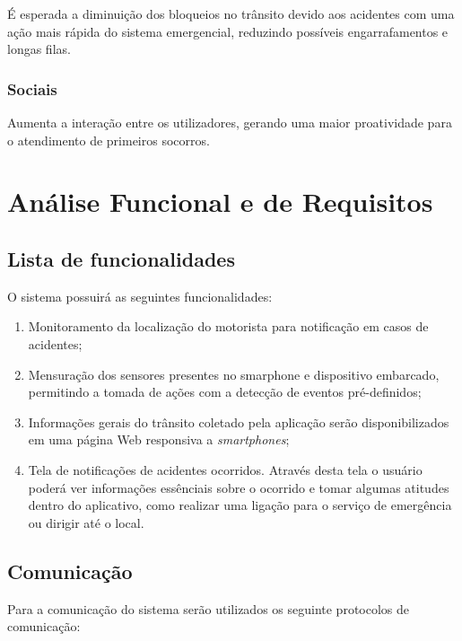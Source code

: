 É esperada a diminuição dos bloqueios no trânsito devido aos acidentes com uma ação mais rápida do sistema emergencial, reduzindo possíveis engarrafamentos e longas filas.





\subsubsection{Sociais}
Aumenta a interação entre os utilizadores, gerando uma maior proatividade para o atendimento de primeiros socorros.


\section{Análise Funcional e de Requisitos}

\subsection{\textbf{Lista de funcionalidades}}
O sistema possuirá as seguintes funcionalidades:

\begin{enumerate}
    \item Monitoramento da localização do motorista para notificação em casos de acidentes;
    
    \item Mensuração dos sensores presentes no smarphone e  dispositivo embarcado, permitindo a tomada de ações com a detecção de eventos pré-definidos;
    
   \item Informações gerais do trânsito coletado pela aplicação serão disponibilizados em uma página Web responsiva a  \textit{smartphones};
   
   \item Tela de notificações de acidentes ocorridos. Através desta tela o usuário poderá ver informações essênciais sobre o ocorrido e tomar algumas atitudes dentro do aplicativo, como realizar uma ligação para o serviço de emergência ou dirigir até o local.
   
\end{enumerate}


\subsection{\textbf{Comunicação}}
Para a comunicação do sistema serão utilizados os seguinte protocolos de comunicação:

